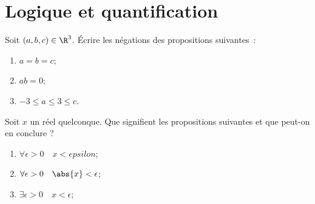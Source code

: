 \chapter{Logique et quantification}

\begin{Exercise}
  Soit $(a, b, c) \in \R^3$. Écrire les négations des propositions suivantes~:
  \begin{enumerate}
  \item $a=b=c$;
  \item $ab=0$;
  \item $-3 \leq a \leq 3 \leq c$.
  \end{enumerate}
\end{Exercise}
%
\begin{Exercise}
  Soit $x$ un réel quelconque. Que signifient les propositions suivantes et que peut-on en conclure ?
  \begin{enumerate}
  \item $\forall \epsilon>0 \quad x<epsilon$;
  \item $\forall \epsilon>0 \quad \abs{x}<\epsilon$;
  \item $\exists \epsilon>0 \quad x<\epsilon$;
  \end{enumerate}

\end{Exercise}

